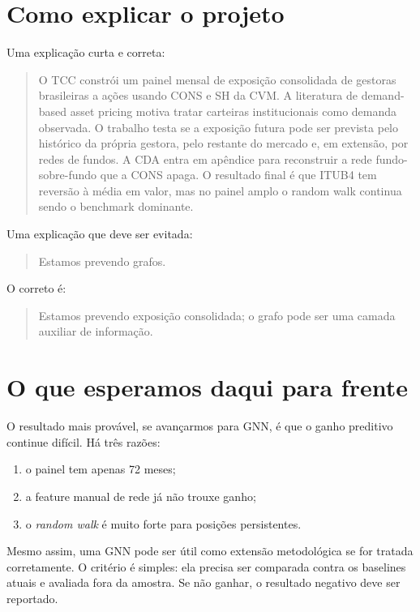 \documentclass[11pt,a4paper]{article}
\begin{document}
\section{Como explicar o projeto}

Uma explicação curta e correta:

\begin{quote}
O TCC constrói um painel mensal de exposição consolidada de gestoras brasileiras a ações usando CONS e SH da
CVM. A literatura de demand-based asset pricing motiva tratar carteiras institucionais como demanda
observada. O trabalho testa se a exposição futura pode ser prevista pelo histórico da própria gestora, pelo
restante do mercado e, em extensão, por redes de fundos. A CDA entra em apêndice para reconstruir a rede
fundo-sobre-fundo que a CONS apaga. O resultado final é que ITUB4 tem reversão à média em valor, mas no
painel amplo o random walk continua sendo o benchmark dominante.
\end{quote}

Uma explicação que deve ser evitada:

\begin{quote}
Estamos prevendo grafos.
\end{quote}

O correto é:

\begin{quote}
Estamos prevendo exposição consolidada; o grafo pode ser uma camada auxiliar de informação.
\end{quote}

\section{O que esperamos daqui para frente}

O resultado mais provável, se avançarmos para GNN, é que o ganho preditivo continue difícil. Há três razões:
\begin{enumerate}
\item o painel tem apenas 72 meses;
\item a feature manual de rede já não trouxe ganho;
\item o \emph{random walk} é muito forte para posições persistentes.
\end{enumerate}

Mesmo assim, uma GNN pode ser útil como extensão metodológica se for tratada corretamente. O critério é
simples: ela precisa ser comparada contra os baselines atuais e avaliada fora da amostra. Se não ganhar, o
resultado negativo deve ser reportado.
\end{document}

